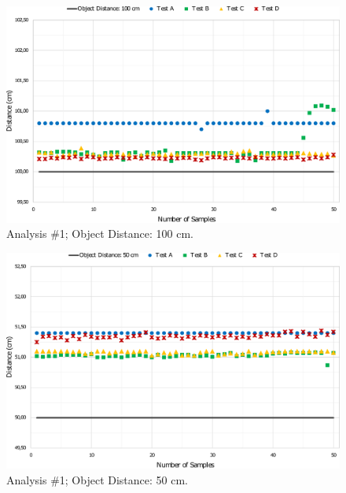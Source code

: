 \begin{figure}[h!]
    \centering
    \includegraphics[scale=0.52]{images/Results/testing_methodology/100cm.pdf}
    \caption{Analysis \#1; Object Distance: 100 cm.}
    \label{fig:100cm}
\end{figure}

\begin{figure}[h!]
    \centering
    \includegraphics[scale=0.52]{images/Results/testing_methodology/50cm.pdf}
    \caption{Analysis \#1; Object Distance: 50 cm.}
    \label{fig:50cm}
\end{figure}

